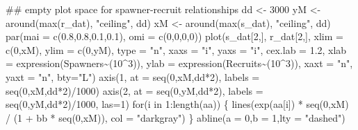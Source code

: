 \documentclass[
  11pt,
]{article}
\newenvironment{Shaded}{}{}
\newcommand{\AttributeTok}[1]{#1}
\newcommand{\ControlFlowTok}[1]{\textcolor[rgb]{0.00,0.00,1.00}{#1}}
\newcommand{\DecValTok}[1]{#1}
\newcommand{\DocumentationTok}[1]{\textcolor[rgb]{0.00,0.50,0.00}{#1}}
\newcommand{\FloatTok}[1]{#1}
\newcommand{\FunctionTok}[1]{#1}
\newcommand{\NormalTok}[1]{#1}
\newcommand{\OtherTok}[1]{\textcolor[rgb]{1.00,0.25,0.00}{#1}}
\newcommand{\SpecialCharTok}[1]{\textcolor[rgb]{0.00,0.50,0.50}{#1}}
\newcommand{\StringTok}[1]{\textcolor[rgb]{0.00,0.50,0.50}{#1}}
\begin{document}
\begin{Shaded}
\begin{Highlighting}[]
\DocumentationTok{\#\# empty plot space for spawner{-}recruit relationships}
\NormalTok{dd }\OtherTok{\textless{}{-}} \DecValTok{3000}
\NormalTok{yM }\OtherTok{\textless{}{-}} \FunctionTok{around}\NormalTok{(}\FunctionTok{max}\NormalTok{(r\_dat), }\StringTok{"ceiling"}\NormalTok{, dd)}
\NormalTok{xM }\OtherTok{\textless{}{-}} \FunctionTok{around}\NormalTok{(}\FunctionTok{max}\NormalTok{(s\_dat), }\StringTok{"ceiling"}\NormalTok{, dd)}
\FunctionTok{par}\NormalTok{(}\AttributeTok{mai =} \FunctionTok{c}\NormalTok{(}\FloatTok{0.8}\NormalTok{,}\FloatTok{0.8}\NormalTok{,}\FloatTok{0.1}\NormalTok{,}\FloatTok{0.1}\NormalTok{), }\AttributeTok{omi =} \FunctionTok{c}\NormalTok{(}\DecValTok{0}\NormalTok{,}\DecValTok{0}\NormalTok{,}\DecValTok{0}\NormalTok{,}\DecValTok{0}\NormalTok{))}
\FunctionTok{plot}\NormalTok{(s\_dat[}\DecValTok{2}\NormalTok{,], r\_dat[}\DecValTok{2}\NormalTok{,], }\AttributeTok{xlim =} \FunctionTok{c}\NormalTok{(}\DecValTok{0}\NormalTok{,xM), }\AttributeTok{ylim =} \FunctionTok{c}\NormalTok{(}\DecValTok{0}\NormalTok{,yM), }\AttributeTok{type =} \StringTok{"n"}\NormalTok{,}
     \AttributeTok{xaxs =} \StringTok{"i"}\NormalTok{, }\AttributeTok{yaxs =} \StringTok{"i"}\NormalTok{, }\AttributeTok{cex.lab =} \FloatTok{1.2}\NormalTok{,}
     \AttributeTok{xlab =} \FunctionTok{expression}\NormalTok{(Spawners}\SpecialCharTok{\textasciitilde{}}\NormalTok{(}\DecValTok{10}\SpecialCharTok{\^{}}\DecValTok{3}\NormalTok{)),}
     \AttributeTok{ylab =} \FunctionTok{expression}\NormalTok{(Recruits}\SpecialCharTok{\textasciitilde{}}\NormalTok{(}\DecValTok{10}\SpecialCharTok{\^{}}\DecValTok{3}\NormalTok{)),}
     \AttributeTok{xaxt =} \StringTok{"n"}\NormalTok{, }\AttributeTok{yaxt =} \StringTok{"n"}\NormalTok{, }\AttributeTok{bty=}\StringTok{"L"}\NormalTok{)}
\FunctionTok{axis}\NormalTok{(}\DecValTok{1}\NormalTok{, }\AttributeTok{at =} \FunctionTok{seq}\NormalTok{(}\DecValTok{0}\NormalTok{,xM,dd}\SpecialCharTok{*}\DecValTok{2}\NormalTok{), }\AttributeTok{labels =} \FunctionTok{seq}\NormalTok{(}\DecValTok{0}\NormalTok{,xM,dd}\SpecialCharTok{*}\DecValTok{2}\NormalTok{)}\SpecialCharTok{/}\DecValTok{1000}\NormalTok{)}
\FunctionTok{axis}\NormalTok{(}\DecValTok{2}\NormalTok{, }\AttributeTok{at =} \FunctionTok{seq}\NormalTok{(}\DecValTok{0}\NormalTok{,yM,dd}\SpecialCharTok{*}\DecValTok{2}\NormalTok{), }\AttributeTok{labels =} \FunctionTok{seq}\NormalTok{(}\DecValTok{0}\NormalTok{,yM,dd}\SpecialCharTok{*}\DecValTok{2}\NormalTok{)}\SpecialCharTok{/}\DecValTok{1000}\NormalTok{, }\AttributeTok{las=}\DecValTok{1}\NormalTok{)}
\ControlFlowTok{for}\NormalTok{(i }\ControlFlowTok{in} \DecValTok{1}\SpecialCharTok{:}\FunctionTok{length}\NormalTok{(aa)) \{}
  \FunctionTok{lines}\NormalTok{(}\FunctionTok{exp}\NormalTok{(aa[i]) }\SpecialCharTok{*} \FunctionTok{seq}\NormalTok{(}\DecValTok{0}\NormalTok{,xM) }\SpecialCharTok{/}\NormalTok{ (}\DecValTok{1} \SpecialCharTok{+}\NormalTok{ bb }\SpecialCharTok{*} \FunctionTok{seq}\NormalTok{(}\DecValTok{0}\NormalTok{,xM)),}
        \AttributeTok{col =} \StringTok{"darkgray"}\NormalTok{)}
\NormalTok{\}}
\FunctionTok{abline}\NormalTok{(}\AttributeTok{a =} \DecValTok{0}\NormalTok{,}\AttributeTok{b =} \DecValTok{1}\NormalTok{,}\AttributeTok{lty =} \StringTok{"dashed"}\NormalTok{)}


\end{Highlighting}
\end{Shaded}
\end{document}
